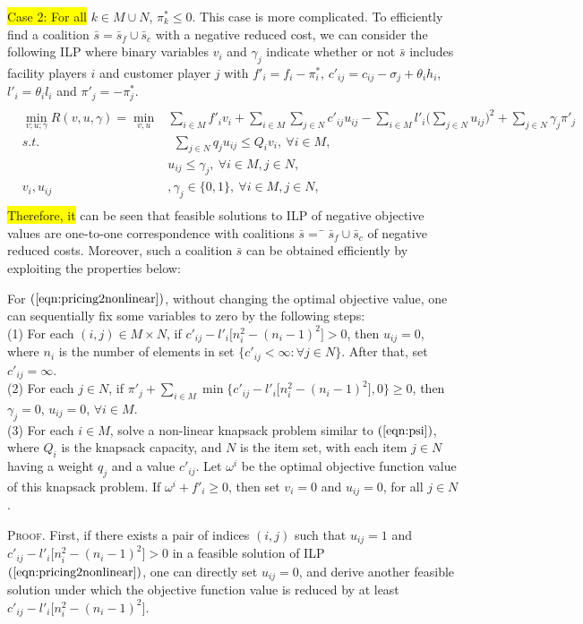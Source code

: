 \documentclass[ijoc,nonblindrev]{informs3} %
\begin{document}
\colorbox{yellow}{Case 2: For all} $k\in M\cup N$,  $\pi^*_k \leq 0$. This case is more complicated. 
To efficiently find a coalition $\bar s = \bar{s}_f \cup \bar{s}_c$ with  a negative reduced cost, we can consider the following ILP where binary variables $v_i$ and $\gamma_j$ indicate 
whether or not $\bar{s}$ includes facility players $i$ and customer player $j$ with $f'_i = f_i - \pi_i^*$, $c'_{ij} = c_{ij}-\sigma_j + \theta_ih_i$, $l'_i = \theta_il_i$ and $\pi'_j = -\pi_j^*$. 
\begin{eqnarray}\label{eqn:pricing2nonlinear}
\begin{aligned}
\begin{split}
\min_{v;u;\gamma} R(v,u,\gamma) = \min_{v,u} &\sum_{i \in M} f'_i v_i + \sum_{i \in M}\sum_{j \in N} c'_{ij}u_{ij} - \sum_{i \in M} l'_i \big(\sum_{j \in N}u_{ij}\big)^2+ \sum_{j \in N} \gamma_j \pi'_j\\ 
s.t.&~~\sum_{j \in N}q_ju_{ij} \leq Q_iv_i, ~\forall i \in M,\\
&u_{ij} \leq \gamma_j,~\forall i \in M, j \in N,\\
v_i, u_{ij}&, \gamma_j \in \big\{0,1\big\},~\forall i \in M, j \in N,
\end{split}
\end{aligned}
\end{eqnarray}
\colorbox{yellow}{Therefore, it} can be seen that feasible solutions to ILP of negative objective values are one-to-one correspondence with coalitions $\bar{s} =  ̄\bar{s}_f \cup \bar{s}_c$ of negative reduced costs. Moreover, such a coalition $\bar{s}$ can be obtained efficiently by exploiting the properties below:

\begin{lemma}\label{lemma:efficientconditions}
For $(\ref{eqn:pricing2nonlinear})$, without changing the optimal objective value, one can sequentially fix some variables to zero by the following steps:\\
{\rm (1)} For each $(i,j)\in M\times N$, if $c'_{ij} - l'_i\big[n_i^2 - (n_i-1)^2\big] > 0$, then $u_{ij}=0$, where $n_i$ is the number of elements in set $\{c'_{ij} < \infty: \forall j \in N\}$. After that, set $c'_{ij}=\infty$.\\
{\rm (2)} For each $j\in N$, if $\pi'_j+\sum_{i\in M}\min\{c'_{ij}- l'_i\big[n_i^2 - (n_i-1)^2\big],0\} \geq 0$, then $\gamma_j=0$, $ u_{ij}=0$,  $\forall i\in M$. \\
{\rm (3)} For each $i\in M$, solve a non-linear knapsack problem similar to $(\ref{eqn:psi})$, where $Q_i$ is the knapsack capacity, and $N$ is the item set, with each item $j\in N$ having a weight $q_j$ and a value $c'_{ij}$. Let $\omega^i$ be the optimal objective function value of this knapsack problem. If   $\omega^{i} + f'_{i} \geq 0$, then set $v_i=0$ and $u_{ij}=0$, for all $j\in N$.
\end{lemma}
{\scshape Proof.}
First, if there exists a pair of indices $(i,j)$ such that $u_{ij} = 1$ and $c'_{ij} - l'_i\big[n_i^2 - (n_i-1)^2\big] > 0$ in a feasible solution of ILP $(\ref{eqn:pricing2nonlinear})$, one can directly set $u_{ij} = 0$, and derive another feasible solution under which the objective function value is reduced by at least $c'_{ij} - l'_i\big[n_i^2 - (n_i-1)^2\big]$.
\end{document}
